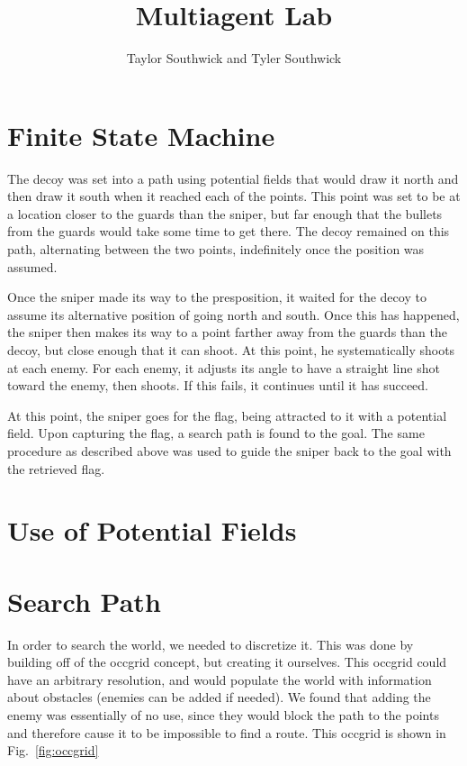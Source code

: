 \documentclass{article}
\author{Taylor Southwick and Tyler Southwick}
\title{Multiagent Lab}
\begin{document}
\maketitle

\section{Finite State Machine}
The decoy was set into a path using potential fields that would draw it north and then draw it south when it reached each of the points.  This point was set to be at a location closer to the guards than the sniper, but far enough that the bullets from the guards would take some time to get there.  The decoy remained on this path, alternating between the two points, indefinitely once the position was assumed.

Once the sniper made its way to the presposition, it waited for the decoy to assume its alternative position of going north and south.  Once this has happened, the sniper then makes its way to a point farther away from the guards than the decoy, but close enough that it can shoot.  At this point, he systematically shoots at each enemy.  For each enemy, it adjusts its angle to have a straight line shot toward the enemy, then shoots.  If this fails, it continues until it has succeed.  

At this point, the sniper goes for the flag, being attracted to it with a potential field.  Upon capturing the flag, a search path is found to the goal.  The same procedure as described above was used to guide the sniper back to the goal with the retrieved flag.

\section{Use of Potential Fields}

\section{Search Path}
In order to search the world, we needed to discretize it.  This was done by building off of the occgrid concept, but creating it ourselves.  This occgrid could have an arbitrary resolution, and would populate the world with information about obstacles (enemies can be added if needed).  We found that adding the enemy was essentially of no use, since they would block the path to the points and therefore cause it to be impossible to find a route.  This occgrid is shown in Fig.~\ref{fig:occgrid}
\end{document}
